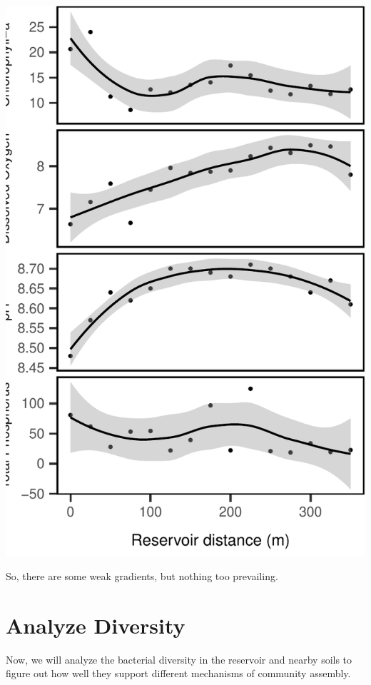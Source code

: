 \documentclass[]{article}
\begin{document}
\begin{center}\includegraphics{ReservoirGradient_files/figure-latex/env_plot-1} \end{center}

So, there are some weak gradients, but nothing too prevailing.

\hypertarget{analyze-diversity}{%
\section{Analyze Diversity}\label{analyze-diversity}}

Now, we will analyze the bacterial diversity in the reservoir and nearby
soils to figure out how well they support different mechanisms of
community assembly.
\end{document}
